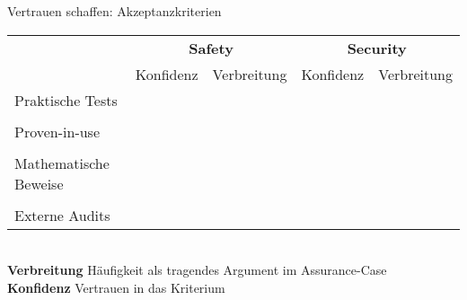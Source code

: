 \begin{frame}[T]{Vertrauen schaffen: Akzeptanzkriterien}
    \begin{tabular}{lrlrl}
      \multirow{2}{*}{}
                          & \multicolumn{2}{c}{\bfseries Safety} & \multicolumn{2}{c}{\bfseries Security} \\[0.2em]
                          &      Konfidenz     &  Verbreitung    &  Konfidenz          &  Verbreitung     \\[0.9em]

    \arrayrulecolor{lightgray}

    Praktische Tests      & \Level{+++}    & \Level{+++}     & \Level{+}           & \Level{++}           \\[-0.10em]
    \midrule                                                                                              \\[-1.20em]
    Proven-in-use         & \Level{++}     & \Level{+}       & \Level{-}           & \Level{+}            \\[-0.10em]
    \midrule                                                                                              \\[-1.20em]
    Mathematische Beweise & \Level{+++}    & \Level{-}       & \Level{+++}         & \Level{++}           \\[-0.10em]
    \midrule                                                                                              \\[-1.20em]
    Externe Audits        & \Level{++}     & \Level{+++}     & \Level{+++}         & \Level{+++}          \\[-0.10em]
    \end{tabular}
    \\[1em]
    \textbf{Verbreitung} Häufigkeit als tragendes Argument im Assurance-Case\\
    \textbf{Konfidenz} Vertrauen in das Kriterium




\end{frame}
